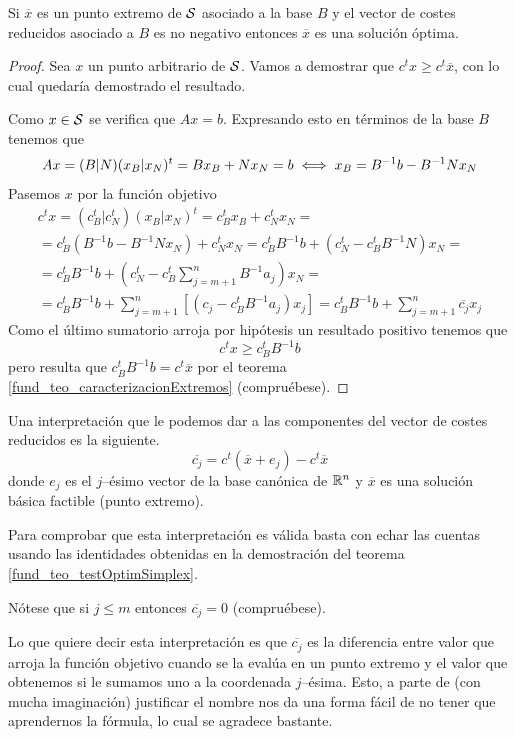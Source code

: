 \begin{theo}
	\label{fund_teo_testOptimSimplex}
	Si $\overline{x}$ es un punto extremo de $\mathcal{S}$ asociado a la base $B$ y el vector de costes reducidos asociado a $B$ es no negativo entonces $\overline{x}$ es una solución óptima.
\end{theo}
\begin{proof}
	Sea $x$ un punto arbitrario de $\mathcal{S}$. Vamos a demostrar que $c^tx\geq c^t\overline{x}$, con lo cual quedaría demostrado el resultado.
	
	Como $x\in \mathcal{S}$ se verifica que $Ax=b$. Expresando esto en términos de la base $B$ tenemos que
	\begin{equation*}
		Ax=(B|N)(x_B|x_N)^t=Bx_B+Nx_N=b\iff x_B=B^{-1}b-B^{-1}Nx_N
	\end{equation*}
	Pasemos $x$ por la función objetivo
	\begin{multline*}
		c^tx=(c_B^t|c_N^t)(x_B|x_N)^t=c_B^tx_B+c_N^tx_N=\\
		=c_B^t(B^{-1}b-B^{-1}Nx_N)+c_N^tx_N= c_B^tB^{-1}b+(c_N^t-c_B^tB^{-1}N)x_N=\\
		=c_B^tB^{-1}b+\left(c_N^t-c_B^t\sum_{j=m+1}^{n}B^{-1}a_j\right)x_N=\\
		=c_B^tB^{-1}b+\sum_{j=m+1}^{n}\left[(c_j-c_B^tB^{-1}a_j)x_j\right]=c_B^tB^{-1}b+\sum_{j=m+1}^{n}\overline{c_j}x_j
	\end{multline*}
	Como el último sumatorio arroja por hipótesis un resultado positivo tenemos que
	\begin{equation*}
		c^tx\geq c_B^tB^{-1}b
	\end{equation*}
	pero resulta que $c_B^tB^{-1}b=c^t\overline{x}$ por el teorema \ref{fund_teo_caracterizacionExtremos} (compruébese). 
\end{proof}
\begin{obs}
	Una interpretación que le podemos dar a las componentes del vector de costes reducidos es la siguiente.
	\begin{equation*}
		\overline{c_j}=c^t(\overline{x}+e_j)-c^t\overline{x}
	\end{equation*}
	donde $e_j$ es el $j$--ésimo vector de la base canónica de $\mathbb{R}^n$ y $\overline{x}$ es una solución básica factible (punto extremo).
	
	Para comprobar que esta interpretación es válida basta con echar las cuentas usando las identidades obtenidas en la demostración del teorema \ref{fund_teo_testOptimSimplex}.
	
	Nótese que si $j\leq m$ entonces $\overline{c_j}=0$ (compruébese).
	
	Lo que quiere decir esta interpretación es que $\overline{c_j}$ es la diferencia entre valor que arroja la función objetivo cuando se la evalúa en un punto extremo y el valor que obtenemos si le sumamos uno a la coordenada $j$--ésima. Esto, a parte de (con mucha imaginación) justificar el nombre nos da una forma fácil de no tener que aprendernos la fórmula, lo cual se agradece bastante.
\end{obs}
